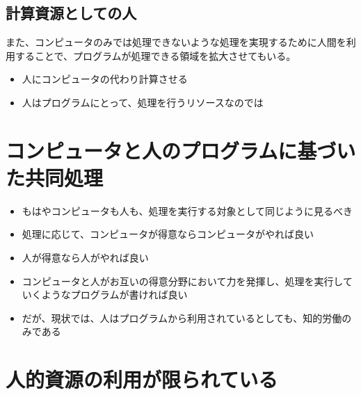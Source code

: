 \subsection{計算資源としての人}\label{ux8a08ux7b97ux8cc7ux6e90ux3068ux3057ux3066ux306eux4eba}

また、コンピュータのみでは処理できないような処理を実現するために人間を利用することで、プログラムが処理できる領域を拡大させてもいる。

\begin{itemize}
\itemsep1pt\parskip0pt
\item
  人にコンピュータの代わり計算させる
\item
  人はプログラムにとって、処理を行うリソースなのでは
\end{itemize}

\section{コンピュータと人のプログラムに基づいた共同処理}\label{ux30b3ux30f3ux30d4ux30e5ux30fcux30bfux3068ux4ebaux306eux30d7ux30edux30b0ux30e9ux30e0ux306bux57faux3065ux3044ux305fux5171ux540cux51e6ux7406}

\begin{itemize}
\itemsep1pt\parskip0pt
\item
  もはやコンピュータも人も、処理を実行する対象として同じように見るべき
\item
  処理に応じて、コンピュータが得意ならコンピュータがやれば良い
\item
  人が得意なら人がやれば良い
\item
  コンピュータと人がお互いの得意分野において力を発揮し、処理を実行していくようなプログラムが書ければ良い
\item
  だが、現状では、人はプログラムから利用されているとしても、知的労働のみである
\end{itemize}

\section{人的資源の利用が限られている}\label{ux4ebaux7684ux8cc7ux6e90ux306eux5229ux7528ux304cux9650ux3089ux308cux3066ux3044ux308b}

